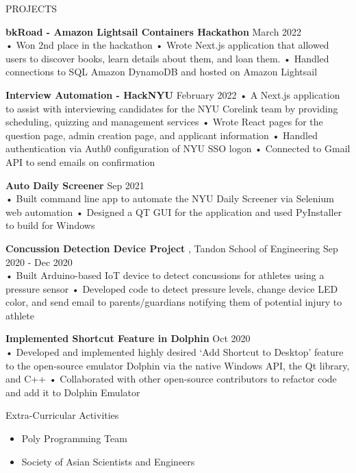 \documentclass{resume} %
\begin{document}
\begin{rSection}{PROJECTS}

\textbf{\bf bkRoad - Amazon Lightsail Containers Hackathon } \hfill March 2022 \\
• Won 2nd place in the hackathon \newline
• Wrote Next.js application that allowed users to discover books, learn details about them, and loan them. \newline
• Handled connections to SQL Amazon DynamoDB and hosted on Amazon Lightsail

\textbf{\bf Interview Automation - HackNYU} \hfill February 2022 \newline
• A Next.js application to assist with interviewing candidates for the NYU Corelink team by providing scheduling, quizzing and management services\newline
• Wrote React pages for the question page, admin creation page, and applicant information \newline
• Handled authentication via Auth0 configuration of NYU SSO logon  \newline
• Connected to Gmail API to send emails on confirmation

\textbf{\bf Auto Daily Screener } \hfill Sep 2021 \\
• Built command line app to automate the NYU Daily Screener via Selenium web automation
\newline
• Designed a QT GUI for the application and used PyInstaller to build for Windows

\textbf{\bf Concussion Detection Device Project }, Tandon School of Engineering \hfill Sep 2020 - Dec 2020 \\
• Built Arduino-based IoT device to detect concussions for athletes using a pressure sensor
\newline
• Developed code to detect pressure levels, change device LED color, and send email to parents/guardians notifying them of potential injury to athlete


\textbf{\bf Implemented Shortcut Feature in Dolphin } \hfill Oct 2020  \\%
• Developed and implemented highly desired ‘Add Shortcut to Desktop’ feature to the open-source emulator Dolphin via the native Windows API, the Qt library, and C++
\newline
• Collaborated with other open-source contributors to refactor code and add it to Dolphin Emulator


\end{rSection} 

\begin{rSection}{Extra-Curricular Activities} 
\begin{itemize} %
    \item 	Poly Programming Team
    \item   Society of Asian Scientists and Engineers

\end{itemize}


\end{rSection}
\end{document}
